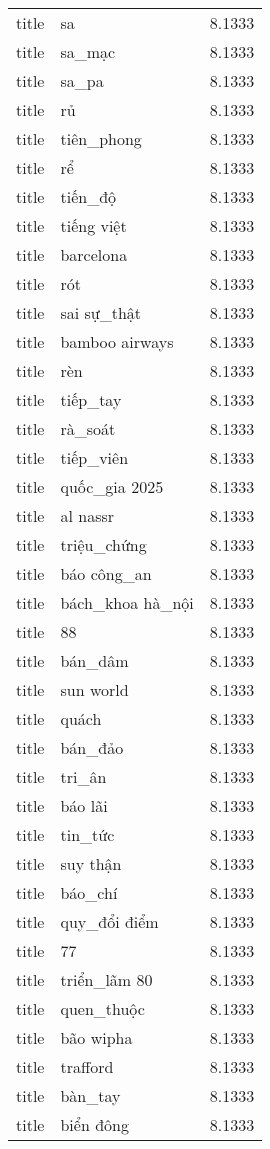 \documentclass{article}
\begin{document}
\begin{tabular}{lll}
title & sa & 8.1333\\
title & sa\_mạc & 8.1333\\
title & sa\_pa & 8.1333\\
title & rủ & 8.1333\\
title & tiên\_phong & 8.1333\\
title & rể & 8.1333\\
title & tiến\_độ & 8.1333\\
title & tiếng việt & 8.1333\\
title & barcelona & 8.1333\\
title & rót & 8.1333\\
title & sai sự\_thật & 8.1333\\
title & bamboo airways & 8.1333\\
title & rèn & 8.1333\\
title & tiếp\_tay & 8.1333\\
title & rà\_soát & 8.1333\\
title & tiếp\_viên & 8.1333\\
title & quốc\_gia 2025 & 8.1333\\
title & al nassr & 8.1333\\
title & triệu\_chứng & 8.1333\\
title & báo công\_an & 8.1333\\
title & bách\_khoa hà\_nội & 8.1333\\
title & 88 & 8.1333\\
title & bán\_dâm & 8.1333\\
title & sun world & 8.1333\\
title & quách & 8.1333\\
title & bán\_đảo & 8.1333\\
title & tri\_ân & 8.1333\\
title & báo lãi & 8.1333\\
title & tin\_tức & 8.1333\\
title & suy thận & 8.1333\\
title & báo\_chí & 8.1333\\
title & quy\_đổi điểm & 8.1333\\
title & 77 & 8.1333\\
title & triển\_lãm 80 & 8.1333\\
title & quen\_thuộc & 8.1333\\
title & bão wipha & 8.1333\\
title & trafford & 8.1333\\
title & bàn\_tay & 8.1333\\
title & biển đông & 8.1333\\

\end{tabular}
\end{document}
